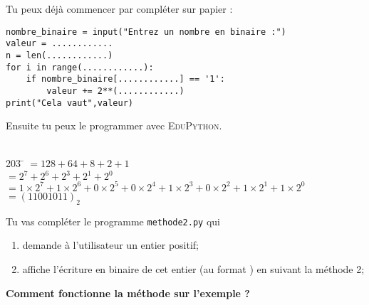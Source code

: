 \documentclass[a4paper,12pt,french]{book}
\begin{document}
Tu peux déjà commencer par compléter sur papier :
\newpage
\begin{verbatim}
nombre_binaire = input("Entrez un nombre en binaire :")
valeur = ............
n = len(............)
for i in range(............):
    if nombre_binaire[............] == '1':
        valeur += 2**(............)
print("Cela vaut",valeur)
\end{verbatim}

Ensuite tu peux le programmer avec \textsc{EduPython}.\\

\exo{}\\
\begin{methode}
\begin{tabbing}
	203	\= 	$=128+64+8+2+1$	\\
	
		\>	$=2^7+2^6+2^3+2^1+2^0$	\\
		
		\>	$=1\times 2^7+1\times 2^6+0\times 2^5 + 0\times 2^4 +1\times 2^3+0\times 2^2 + 1\times 
		2^1+1\times 2^0$	\\
		
		\> $=(11001011)_2$
\end{tabbing}
\end{methode}

Tu vas compléter le programme \texttt{methode2.py} qui
\begin{enumerate}[--]
	\item 	demande à l'utilisateur un entier positif;
	\item 	affiche l'écriture en binaire de cet entier (au format ) en suivant la méthode 2;\\
\end{enumerate}

\textbf{Comment fonctionne la méthode sur l'exemple ?}\\
\end{document}
